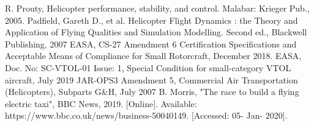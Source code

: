 \documentclass[11pt,a4paper]{article}
\begin{document}
\begin{thebibliography}{}
R. Prouty, Helicopter performance, stability, and control. Malabar: Krieger Pub., 2005.
 Padfield, Gareth D., et al. Helicopter Flight Dynamics : the Theory and Application of Flying Qualities and
Simulation Modelling. Second ed., Blackwell Publishing, 2007
 EASA, CS-27 Amendment 6 Certification Specifications and Acceptable Means of Compliance for Small Rotorcraft, December 2018.
EASA, Doc. No: SC-VTOL-01 Issue: 1, Special Condition for small-category VTOL aircraft, July 2019
 JAR-OPS3 Amendment 5, Commercial Air Transportation (Helicopters), Subparts G&H, July 2007
B. Morris, "The race to build a flying electric taxi", BBC News, 2019. [Online]. Available: https://www.bbc.co.uk/news/business-50040149. [Accessed: 05- Jan- 2020].
\end{thebibliography}{}
\newpage
\end{document}
